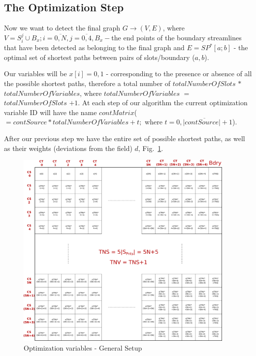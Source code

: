 \documentclass[a4paper]{report}
\begin{document}
{{			
		
		
		
}

\newpage
\subsection{The Optimization Step}{

Now we want to detect the final graph $G \rightarrow (V, E)$, where $V = S_i^j \cup B_x;  i = \overline{0,N} , j = \overline{0,4} , B_x -$the end points of the boundary streamlines that have been detected as belonging to the final graph and $E = SP^*[a;b]$ - the optimal set of shortest paths between pairs of slots/boundary ($a,b$).

Our variables will be $x[i] = {0,1}$ - corresponding to the presence or absence of all the possible shortest paths, therefore a total number of \textcolor{myGreen}{$totalNumberOfSlots$} $ * $ \textcolor{myGreen}{$totalNumberOfVariables$}, where 
 \textcolor{myGreen}{$totalNumberOfVariables$} $=$ \textcolor{myGreen}{$totalNumberOfSlots$} $+1$. At each step of our algorithm the current optimization variable ID will have the name \textcolor{myGreen}{$contMatrix$}($ = contSource*totalNumberOfVariables + t;$ where $t=\overline{0,|contSource|+1}$).

After our previous step we have the entire set of possible shortest paths, as well as their weights (deviations from the field) $d$, Fig.~\ref{fig:optVar}. 

\begin{figure}[h]
\includegraphics[width=0.95\textwidth]{optVar}
\caption{Optimization variables - General Setup}
\label{fig:optVar}
\end{figure}

}}
\end{document}
